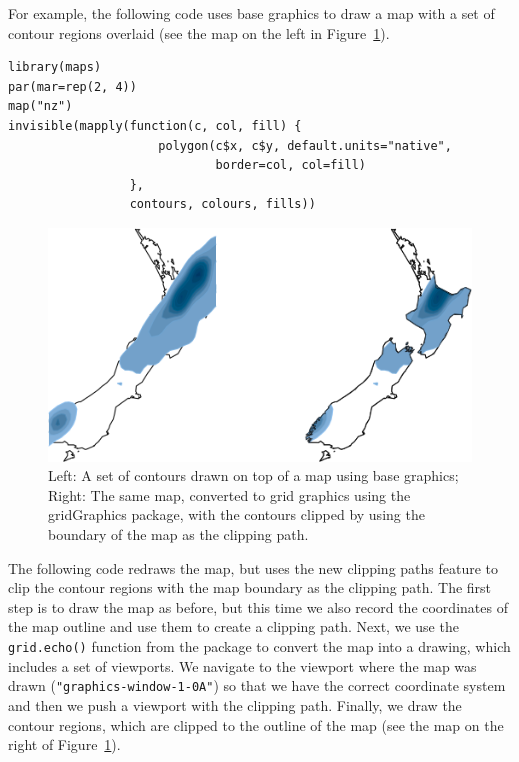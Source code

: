 For example, the following code uses base graphics to draw a map
with a set of contour regions overlaid
(see the map on the left in Figure~\ref{fig:map}).

\begin{verbatim}
library(maps)
par(mar=rep(2, 4))
map("nz")
invisible(mapply(function(c, col, fill) {
                     polygon(c$x, c$y, default.units="native", 
                             border=col, col=fill)
                 },
                 contours, colours, fills))
\end{verbatim}

\begin{figure}[h]
\includegraphics[width=1\linewidth]{murrell-definitions-2023_files/figure-latex/map-1} \caption{Left:  A set of contours drawn on top of a map using base graphics;  Right: The same map, converted to grid graphics using the gridGraphics package, with the contours clipped by using the boundary of the map as the clipping path.}\label{fig:map}
\end{figure}

The following code redraws the map, but
uses the new clipping paths feature to clip the
contour regions with the map boundary as the clipping path.
The first step is to draw the map as before, but this time we also
record the coordinates of the map outline and use them to create
a clipping path.
Next, we use the \texttt{grid.echo()} function from the  package
to convert the map into a  drawing, which includes a set
of  viewports.
We navigate to the viewport where the map was drawn
(\texttt{"graphics-window-1-0A"}) so that we have the correct coordinate
system and then we push a viewport with the clipping path.
Finally, we draw the contour regions, which are clipped
to the outline of the map (see the map on the right of
Figure~\ref{fig:map}).

